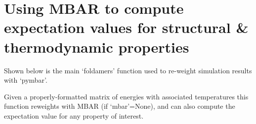 \documentclass[letterpaper,12pt,english,openany,oneside]{sphinxmanual}
\begin{document}
\section{Using MBAR to compute expectation values for structural \& thermodynamic properties}
\label{\detokenize{thermo:using-mbar-to-compute-expectation-values-for-structural-thermodynamic-properties}}
Shown below is the main ‘foldamers’ function used to re-weight simulation results with ‘pymbar’.

\label{\detokenize{thermo:module-parameters.reweight}}

\begin{fulllineitems}
\label{\detokenize{thermo:parameters.reweight.get_mbar_expectation}}
Given a properly-formatted matrix of energies with associated temperatures this function reweights with MBAR (if ‘mbar’=None), and can also compute the expectation value for any property of interest.


\end{fulllineitems}
\end{document}
